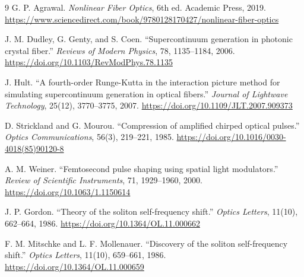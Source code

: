 \documentclass[11pt]{article}
\begin{document}
\begin{thebibliography}{9}
G. P. Agrawal. \textit{Nonlinear Fiber Optics}, 6th ed. Academic Press, 2019.
\url{https://www.sciencedirect.com/book/9780128170427/nonlinear-fiber-optics}

J. M. Dudley, G. Genty, and S. Coen. ``Supercontinuum generation in photonic
crystal fiber.'' \textit{Reviews of Modern Physics}, 78, 1135--1184, 2006.
\url{https://doi.org/10.1103/RevModPhys.78.1135}

J. Hult. ``A fourth-order Runge-Kutta in the interaction picture method for
simulating supercontinuum generation in optical fibers.'' \textit{Journal of
Lightwave Technology}, 25(12), 3770--3775, 2007.
\url{https://doi.org/10.1109/JLT.2007.909373}

D. Strickland and G. Mourou. ``Compression of amplified chirped optical
pulses.'' \textit{Optics Communications}, 56(3), 219--221, 1985.
\url{https://doi.org/10.1016/0030-4018(85)90120-8}

A. M. Weiner. ``Femtosecond pulse shaping using spatial light modulators.''
\textit{Review of Scientific Instruments}, 71, 1929--1960, 2000.
\url{https://doi.org/10.1063/1.1150614}

J. P. Gordon. ``Theory of the soliton self-frequency shift.'' \textit{Optics
Letters}, 11(10), 662--664, 1986. \url{https://doi.org/10.1364/OL.11.000662}

F. M. Mitschke and L. F. Mollenauer. ``Discovery of the soliton
self-frequency shift.'' \textit{Optics Letters}, 11(10), 659--661, 1986.
\url{https://doi.org/10.1364/OL.11.000659}
\end{thebibliography}
\end{document}
